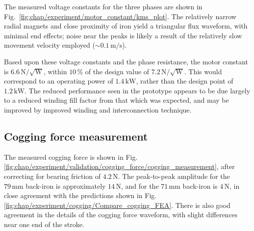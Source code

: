             The measured voltage constants for the three phases are shown in Fig.~\ref{fig:chap/experiment/motor_constant/kms_plot}. The relatively narrow radial magnets and close proximity of iron yield a triangular flux waveform, with minimal end effects; noise near the peaks is likely a result of the relatively slow movement velocity employed ($\sim0.1\,\mathrm{m/s}$). 
            
            Based upon these voltage constants and the phase resistance, the motor constant is $6.6\,\mathrm{N/ \sqrt{ \mathrm{W}}}$, within $10\,\%$ of the design value of $7.2\,\mathrm{N/ \sqrt{ \mathrm{W}}}$. This would correspond to an operating power of $1.4\,\mathrm{kW}$, rather than the design point of $1.2\,\mathrm{kW}$. The reduced performance seen in the prototype appears to be due largely to a reduced winding fill factor from that which was expected, and may be improved by improved winding and interconnection technique.

        
        
        \subsection{Cogging force measurement}      \label{Chapter:experiment/validation/cogging force}
        
        
            The measured cogging force is shown in Fig.\,\ref{fig:chap/experiment/validation/cogging_force/cogging_measurement}, after correcting for bearing friction of $4.2\,\mathrm{N}$. The peak-to-peak amplitude for the $79\,\mathrm{mm}$ back-iron is approximately $14\,\mathrm{N}$, and for the $71\,\mathrm{mm}$ back-iron is $4\,\mathrm{N}$, in close agreement with the predictions shown in Fig.\,\ref{fig:chap/experiment/cogging/Compare_cogging_FEA}. There is also good agreement in the details of the cogging force waveform, with slight differences near one end of the stroke.
            
